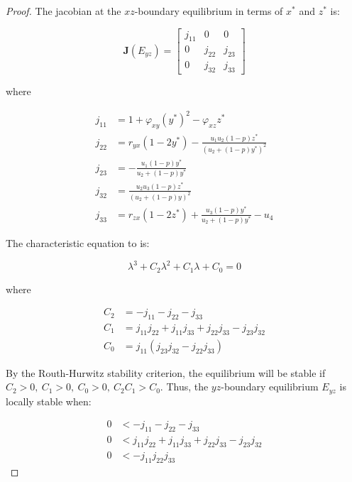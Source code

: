\begin{proof}
    The jacobian at the $xz$-boundary equilibrium in terms of $x^*$ and $z^*$ is:

    \begin{equation}\label{matrix:jacobian-boundary-yz}
        \textbf{J}\left(E_{yz}\right) = \begin{bmatrix}
            j_{11} & 0 & 0\\
            0 & j_{22} & j_{23}\\
            0 & j_{32} & j_{33}
        \end{bmatrix}
    \end{equation}

    where
    
    \begin{align*}
        j_{11} &= 1+\varphi_{xy}\left(y^*\right)^2-\varphi_{xz}z^*\\
        j_{22} &= r_{yx}\left(1-2y^*\right)-\frac{u_1u_2\left(1-p\right)z^*}{\left(u_2+\left(1-p\right)y^*\right)^2}\\
        j_{23} &= -\frac{u_1\left(1-p\right)y^*}{u_2+\left(1-p\right)y^*}\\
        j_{32} &= \frac{u_2u_3\left(1-p\right)z^*}{\left(u_2+\left(1-p\right)y\right)^2}\\
        j_{33} &= r_{zx}\left(1-2z^*\right)+\frac{u_3\left(1-p\right)y^*}{u_2+\left(1-p\right)y^*}-u_4
    \end{align*}

    The characteristic equation to  is:

    \begin{equation*}\label{eq:char-eq-yz}
        \lambda^3+C_2\lambda^2+C_1\lambda+C_0=0
    \end{equation*}

    where
    
    \begin{align*}
        C_2 &= -j_{11}-j_{22}-j_{33}\\
        C_1 &= j_{11}j_{22}+j_{11}j_{33}+j_{22}j_{33}-j_{23}j_{32}\\
        C_0 &= j_{11}\left(j_{23}j_{32}-j_{22}j_{33}\right)
    \end{align*}

    By the Routh-Hurwitz stability criterion, the equilibrium will be stable if $C_2>0,\ C_1>0,\ C_0>0,\ C_2C_1>C_0$. Thus, the $yz$-boundary equilibrium $E_{yz}$ is locally stable when:

    \begin{align*}
        0 &< -j_{11}-j_{22}-j_{33}\\
        0 &< j_{11}j_{22}+j_{11}j_{33}+j_{22}j_{33}-j_{23}j_{32}\\
        0 &< -j_{11}j_{22}j_{33}
    \end{align*}


\end{proof}
